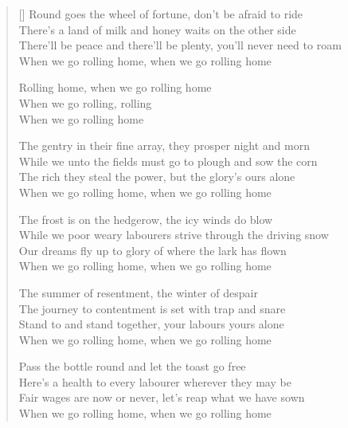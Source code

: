 \pagebreak
\settowidth{\versewidth}{While we unto the fields must go to plough and sow the corn}
\begin{verse}[\versewidth]
Round goes the wheel of fortune, don't be afraid to ride\\
There's a land of milk and honey waits on the other side\\
There'll be peace and there'll be plenty, you'll never need to roam\\
When we go rolling home, when we go rolling home

\begin{chorus}
Rolling home, when we go rolling home\\
When we go rolling, rolling\\
When we go rolling home
\end{chorus}

The gentry in their fine array, they prosper night and morn\\
While we unto the fields must go to plough and sow the corn\\
The rich they steal the power, but the glory's ours alone\\
When we go rolling home, when we go rolling home

The frost is on the hedgerow, the icy winds do blow\\
While we poor weary labourers strive through the driving snow\\
Our dreams fly up to glory of where the lark has flown\\
When we go rolling home, when we go rolling home

The summer of resentment, the winter of despair\\
The journey to contentment is set with trap and snare\\
Stand to and stand together, your labours yours alone\\
When we go rolling home, when we go rolling home

Pass the bottle round and let the toast go free\\
Here's a health to every labourer wherever they may be\\
Fair wages are now or never, let's reap what we have sown\\
When we go rolling home, when we go rolling home

\end{verse}
